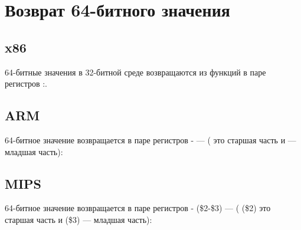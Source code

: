 ﻿\section{Возврат 64-битного значения}



\subsection{x86}

64-битные значения в 32-битной среде возвращаются из функций в паре регистров \EDX{}:\EAX{}.



\subsection{ARM}

64-битное значение возвращается в паре регистров - --- ( это старшая часть и  --- младшая часть):



\subsection{MIPS}

64-битное значение возвращается в паре регистров - (\$2-\$3) --- ( (\$2) это старшая часть и  (\$3) --- младшая часть):





